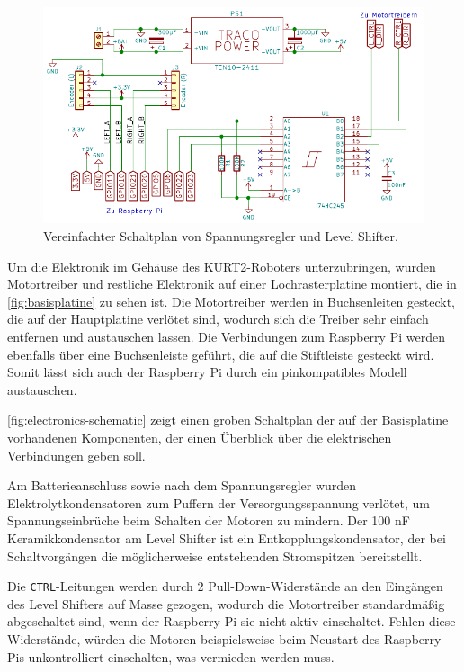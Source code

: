 \documentclass[german]{thesis_KBS}
\newcommand{\code}[1]{\texttt{#1}}  %
\begin{document}
\begin{figure}
    \centering
    \includegraphics[width=\textwidth]{kicad/electronics/electronics-cropped.pdf}
    \caption{
        Vereinfachter Schaltplan von Spannungsregler und Level Shifter.
    }
    \label{fig:electronics-schematic}
\end{figure}

Um die Elektronik im Gehäuse des KURT2-Roboters unterzubringen, wurden
Motortreiber und restliche Elektronik auf einer Lochrasterplatine montiert, die
in \autoref{fig:basisplatine} zu sehen ist. Die Motortreiber werden in
Buchsenleiten gesteckt, die auf der Hauptplatine verlötet sind, wodurch sich die
Treiber sehr einfach entfernen und austauschen lassen. Die Verbindungen zum
Raspberry Pi werden ebenfalls über eine Buchsenleiste geführt, die auf die
Stiftleiste gesteckt wird. Somit lässt sich auch der Raspberry Pi durch ein
pinkompatibles Modell austauschen.

\autoref{fig:electronics-schematic} zeigt einen groben Schaltplan der auf der
Basisplatine vorhandenen Komponenten, der einen Überblick über die elektrischen
Verbindungen geben soll.

Am Batterieanschluss sowie nach dem Spannungsregler wurden
Elektrolytkondensatoren zum Puffern der Versorgungsspannung verlötet, um
Spannungseinbrüche beim Schalten der Motoren zu mindern. Der 100 nF
Keramikkondensator am Level Shifter ist ein Entkopplungskondensator, der bei
Schaltvorgängen die möglicherweise entstehenden Stromspitzen bereitstellt.

Die \code{CTRL}-Leitungen werden durch 2 Pull-Down-Widerstände an den Eingängen
des Level Shifters auf Masse gezogen, wodurch die Motortreiber standardmäßig
abgeschaltet sind, wenn der Raspberry Pi sie nicht aktiv einschaltet. Fehlen
diese Widerstände, würden die Motoren beispielsweise beim Neustart des Raspberry
Pis unkontrolliert einschalten, was vermieden werden muss.
\end{document}
